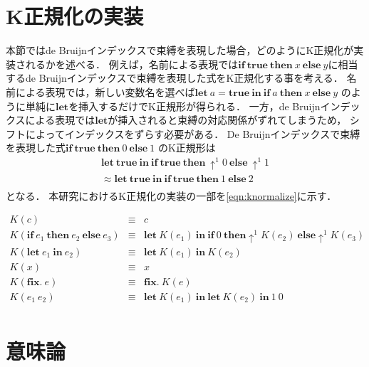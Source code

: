 \documentclass[T]{compsoft}
\newcommand{\keyword}[1]{\mathbf{#1}}
\newcommand{\TRUE}{\keyword{true}}
\newcommand{\IF}{\keyword{if}}
\newcommand{\THEN}{\keyword{then}}
\newcommand{\ELSE}{\keyword{else}}
\newcommand{\LET}{\keyword{let}}
\newcommand{\FIX}{\keyword{fix}}
\newcommand{\IN}{\keyword{in}}
\begin{document}
\section{K正規化の実装}\label{section:knormal-implement}
本節ではde Bruijnインデックスで束縛を表現した場合，どのようにK正規化が実装されるかを述べる．
例えば，名前による表現では$\IF~\TRUE~\THEN~x~\ELSE~y$に相当するde Bruijnインデックスで束縛を表現した式をK正規化する事を考える．
名前による表現では，新しい変数名を選べば$\LET~a = \TRUE~\IN~\IF~a~\THEN~x~\ELSE~y$
のように単純に$\LET$を挿入するだけでK正規形が得られる．
一方，de Bruijnインデックスによる表現では$\LET$が挿入されると束縛の対応関係がずれてしまうため，
シフトによってインデックスをずらす必要がある．
De Bruijnインデックスで束縛を表現した式$\IF~\TRUE~\THEN~0~\ELSE~1$
のK正規形は
\[ 
	\begin{array}{l}
		\LET~\TRUE~\IN~\IF~\TRUE~\THEN~\uparrow^1 0~\ELSE~\uparrow^1 1 \\
		\approx \LET~\TRUE~\IN~\IF~\TRUE~\THEN~1~\ELSE~2 \\
	\end{array}
\]
となる．
本研究におけるK正規化の実装の一部を\figurename\ref{eqn:knormalize}に示す．
\begin{figure*}[tp]
	\[\begin{array}{rcl}
		K(c) & \equiv & c \\
		K(\IF~e_1~\THEN~e_2~\ELSE~e_3) & \equiv & \LET~ K(e_1)~\IN~\IF~0~\THEN\uparrow^1 K(e_2)~\ELSE\uparrow^1 K(e_3) \\
		K(\LET~ e_1~\IN~e_2) & \equiv & \LET~K(e_1)~\IN~K(e_2) \\ 
		K(x) & \equiv & x \\
		K(\FIX.~e) & \equiv & \FIX.~K(e) \\
		K(e_1~e_2) & \equiv & \LET~ K(e_1)~\IN~\LET~ K(e_2)~\IN~1~0 \\
	\end{array}\]
	\caption{K正規化の実装の一部}
	\label{eqn:knormalize}
\end{figure*}

\section{意味論}\label{section:semantics}
\end{document}
